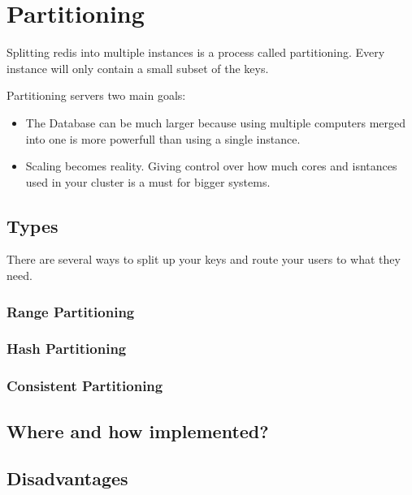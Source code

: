 \chapter{Partitioning}

Splitting redis into multiple instances is a process called partitioning. Every instance will only contain a small subset of the keys.

Partitioning servers two main goals:
\begin{itemize}
\item The Database can be much larger because using multiple computers merged into one is more powerfull than using a single instance.
\item Scaling becomes reality. Giving control over how much cores and isntances used in your cluster is a must for bigger systems.
\end{itemize}

\section{Types}
There are several ways to split up your keys and route your users to what they need.

\subsection{Range Partitioning}
\subsection{Hash Partitioning}
\subsection{Consistent Partitioning}

\section{Where and how implemented?}

\section{Disadvantages}